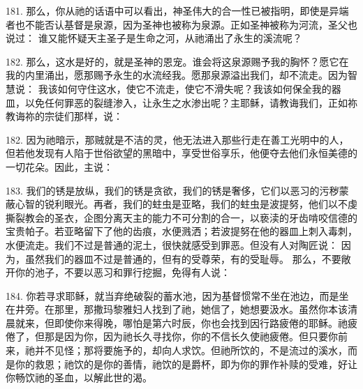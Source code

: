 181. 那么，你从祂的话语中可以看出，神圣伟大的合一性已被指明，即使是异端者也不能否认基督是泉源，因为圣神也被称为泉源。正如圣神被称为河流，圣父也说过： 谁又能怀疑天主圣子是生命之河，从祂涌出了永生的溪流呢？\par

182. 那么，这水是好的，就是圣神的恩宠。谁会将这泉源赐予我的胸怀？愿它在我的内里涌出，愿那赐予永生的水流经我。愿那泉源溢出我们，却不流走。因为智慧说： 我该如何守住这水，使它不流走，使它不滑失呢？我该如何保全我的器皿，以免任何罪恶的裂缝渗入，让永生之水渗出呢？主耶稣，请教诲我们，正如祢教诲祢的宗徒们那样，说：\par

182. 因为祂暗示，那贼就是不洁的灵，他无法进入那些行走在善工光明中的人，但若他发现有人陷于世俗欲望的黑暗中，享受世俗享乐，他便夺去他们永恒美德的一切花朵。因此，主说：\par

183. 我们的锈是放纵，我们的锈是贪欲，我们的锈是奢侈，它们以恶习的污秽蒙蔽心智的锐利眼光。再者，我们的蛀虫是亚略，我们的蛀虫是波提努，他们以不虔撕裂教会的圣衣，企图分离天主的能力不可分割的合一，以亵渎的牙齿啃咬信德的宝贵帕子。若亚略留下了他的齿痕，水便溅洒；若波提努在他的器皿上刺入毒刺，水便流走。我们不过是普通的泥土，很快就感受到罪恶。但没有人对陶匠说： 因为，虽然我们的器皿不过是普通的，但有的受尊荣，有的受耻辱。 那么，不要敞开你的池子，不要以恶习和罪行挖掘，免得有人说：\par

184. 你若寻求耶稣，就当弃绝破裂的蓄水池，因为基督惯常不坐在池边，而是坐在井旁。在那里，那撒玛黎雅妇人找到了祂，她信了，她想要汲水。虽然你本该清晨就来，但即使你来得晚，哪怕是第六时辰，你也会找到因行路疲倦的耶稣。祂疲倦了，但那是因为你，因为祂长久寻找你，你的不信长久使祂疲倦。但只要你前来，祂并不见怪；那将要施予的，却向人求饮。但祂所饮的，不是流过的溪水，而是你的救恩；祂饮的是你的善情，祂饮的是爵杯，即为你的罪作补赎的受难，好让你畅饮祂的圣血，以解此世的渴。\par

